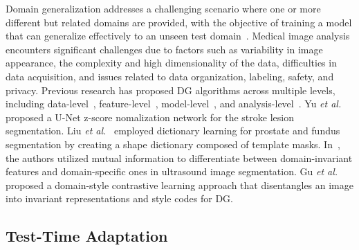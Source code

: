 Domain generalization addresses a challenging scenario where one or more different but related domains are provided, with the objective of training a model that can generalize effectively to an unseen test domain~\cite{wang2022generalizing,zhou2022domain,yoon2023domain}. Medical image analysis encounters significant challenges due to factors such as variability in image appearance, the complexity and high dimensionality of the data, difficulties in data acquisition, and issues related to data organization, labeling, safety, and privacy. Previous research has proposed DG algorithms across multiple levels, including data-level~\cite{yu2023san,zhang2020generalizing}, feature-level~\cite{bi2023mi,li2018domain}, model-level~\cite{gu2023cddsa,peng2019moment,zuo2021attention}, and analysis-level~\cite{liu2022single,qiao2020learning}. Yu \textit{et al.}~\cite{yu2023san} proposed a U-Net z-score nomalization network for the stroke lesion segmentation. Liu \textit{et al.}~\cite{liu2022single} employed dictionary learning for prostate and fundus segmentation by creating a shape dictionary composed of template masks. In~\cite{bi2023mi}, the authors utilized mutual information to differentiate between domain-invariant features and domain-specific ones in ultrasound image segmentation. Gu \textit{et al.}~\cite{gu2023cddsa} proposed a domain-style contrastive learning approach that disentangles an image into invariant representations and style codes for DG. 

\subsection{Test-Time Adaptation}

